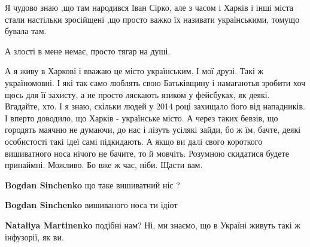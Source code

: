 \begin{itemize}
\begin{itemize}
\begin{itemize}
Я чудово знаю ,що там народився Іван Сірко, але з часом і Харків і інші міста
стали настільки зросійщені ,що просто важко їх називати українськими, томущо
бувала там.

А злості в мене немає, просто тягар на душі.

\end{itemize}

 

А я живу в Харкові і вважаю це місто українським. І мої друзі. Такі ж
україномовні. І які так само люблять свою Батьківщину і намагаютья зробити хоч
щось для її захисту, а не просто ляскають язиком у фейсбуках, як деякі.
Вгадайте, хто. І я знаю, скільки людей у 2014 році захищало його від
нападників. І вперто доводило, що Харків - українське місто. А через таких
бевзів, що городять маячню не думаючи, до нас і лізуть усілякі зайди, бо ж їм,
бачте, деякі особистості такі ідеї самі підкидають. А якщо ви далі свого
короткого вишиватного носа нічого не бачите, то й мовчіть. Розумною скидатися
будете принаймні. Можливо. Бо вже ж час, ніби. Щасти вам.

\begin{itemize}
 
\textbf{Bogdan Sinchenko} що таке вишиватний ніс ?

 
\textbf{Bogdan Sinchenko} вишиваного носа ти ідіот
\end{itemize}

 
\textbf{Nataliya Martinenko} подібні нам? Ні, ми знаємо, що в Україні живуть такі ж інфузорії, як ви.


\end{itemize}
\end{itemize}
